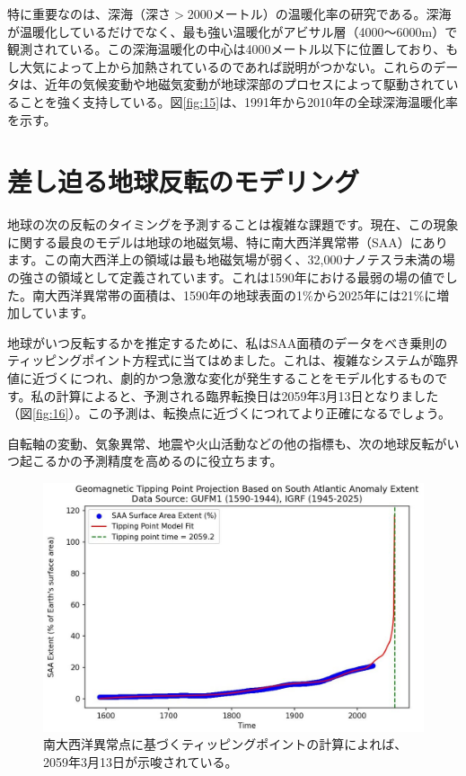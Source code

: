 \documentclass[10pt,twocolumn,letterpaper]{article}
\begin{document}
特に重要なのは、深海（深さ$>$2000メートル）の温暖化率の研究である。深海が温暖化しているだけでなく、最も強い温暖化がアビサル層（4000〜6000m）で観測されている。この深海温暖化の中心は4000メートル以下に位置しており\cite{132,129}、もし大気によって上から加熱されているのであれば説明がつかない。これらのデータは、近年の気候変動や地磁気変動が地球深部のプロセスによって駆動されていることを強く支持している。図\ref{fig:15}は、1991年から2010年の全球深海温暖化率を示す\cite{132}。

\section{差し迫る地球反転のモデリング}

地球の次の反転のタイミングを予測することは複雑な課題です。現在、この現象に関する最良のモデルは地球の地磁気場、特に南大西洋異常帯（SAA）にあります。この南大西洋上の領域は最も地磁気場が弱く、32,000ナノテスラ未満の場の強さの領域として定義されています\cite{135}。これは1590年における最弱の場の値でした。南大西洋異常帯の面積は、1590年の地球表面の1\%から2025年には21\%に増加しています\cite{136}。

地球がいつ反転するかを推定するために、私はSAA面積のデータをべき乗則のティッピングポイント方程式に当てはめました。これは、複雑なシステムが臨界値に近づくにつれ、劇的かつ急激な変化が発生することをモデル化するものです。私の計算によると、予測される臨界転換日は2059年3月13日となりました（図\ref{fig:16}）。この予測は、転換点に近づくにつれてより正確になるでしょう\cite{136}。

自転軸の変動、気象異常、地震や火山活動などの他の指標も、次の地球反転がいつ起こるかの予測精度を高めるのに役立ちます。

\begin{figure}[t]
\begin{center}
   \includegraphics[width=1\linewidth]{saa-crop.jpeg}
\end{center}
   \caption{南大西洋異常点に基づくティッピングポイントの計算によれば、2059年3月13日が示唆されている\cite{125,126}。}
\label{fig:16}
\label{fig:onecol}
\end{figure}
\end{document}
